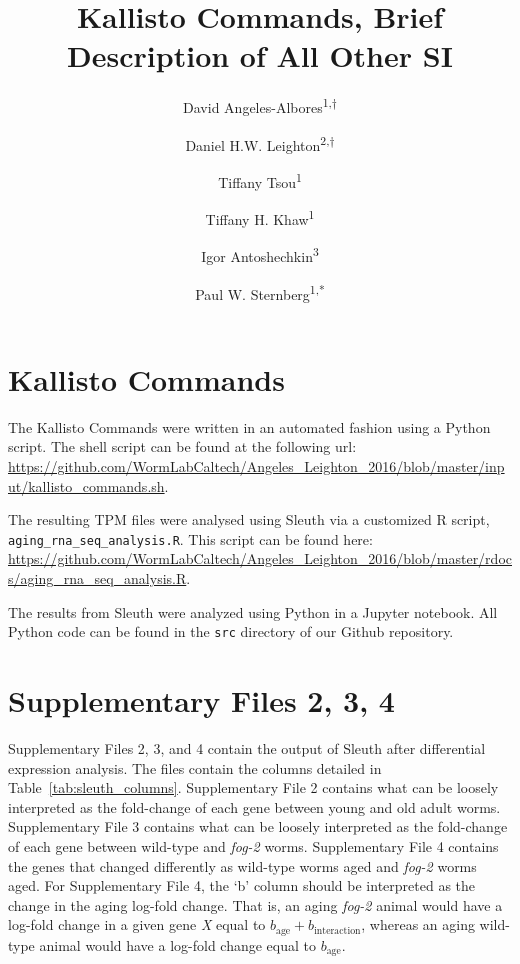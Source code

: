 \documentclass{article}
\title{Kallisto Commands, Brief Description of All Other SI}
\author{David Angeles-Albores\textsuperscript{1,$\dagger{}$}
\and{}
Daniel H.W. Leighton\textsuperscript{2,$\dagger{}$}
\and{}
Tiffany Tsou\textsuperscript{1}
\and{}
Tiffany H. Khaw\textsuperscript{1}
\and{}
Igor Antoshechkin\textsuperscript{3}
\and{}
Paul W. Sternberg\textsuperscript{1,*}
}
\begin{document}
 \maketitle
 \tableofcontents

 \section{Kallisto Commands}

 The Kallisto Commands were written in an automated fashion using a Python script. The shell script can be found at the following url: \url{https://github.com/WormLabCaltech/Angeles_Leighton_2016/blob/master/input/kallisto_commands.sh}.

 The resulting TPM files were analysed using Sleuth via a customized R script, \texttt{aging\_rna\_seq\_analysis.R}. This script can be found here: \url{https://github.com/WormLabCaltech/Angeles_Leighton_2016/blob/master/rdocs/aging_rna_seq_analysis.R}.

 The results from Sleuth were analyzed using Python in a Jupyter notebook. All Python code can be found in the \texttt{src} directory of our Github repository.


\section{Supplementary Files 2, 3, 4}

Supplementary Files 2, 3, and 4 contain the output of Sleuth after differential expression analysis. The files contain the columns detailed in Table~\ref{tab:sleuth_columns}. Supplementary File 2 contains what can be loosely interpreted as the fold-change of each gene between young and old adult worms. Supplementary File 3 contains what can be loosely interpreted as the fold-change of each gene between wild-type and \emph{fog-2} worms. Supplementary File 4 contains the genes that changed differently as wild-type worms aged and \emph{fog-2} worms aged. For Supplementary File 4, the `b' column should be interpreted as the change in the aging log-fold change. That is, an aging \emph{fog-2} animal would have a log-fold change in a given gene \emph{X} equal to $b_\mathrm{age} + b_\mathrm{interaction}$, whereas an aging wild-type animal would have a log-fold change equal to $b_\mathrm{age}$.
\end{document}
